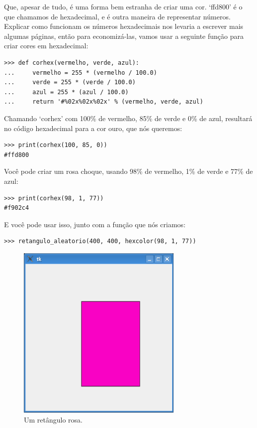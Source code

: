 Que, apesar de tudo, é uma forma bem estranha de criar uma cor. `ffd800' é o que chamamos de hexadecimal, e é outra maneira de representar números. Explicar como funcionam os números hexadecimais nos levaria a escrever mais algumas páginas, então para economizá-las, vamos usar a seguinte função para criar cores em hexadecimal:

\begin{listing}
\begin{verbatim}
>>> def corhex(vermelho, verde, azul):
...     vermelho = 255 * (vermelho / 100.0)
...     verde = 255 * (verde / 100.0)
...     azul = 255 * (azul / 100.0)
...     return '#%02x%02x%02x' % (vermelho, verde, azul)
\end{verbatim}
\end{listing}

Chamando `corhex' com 100\% de vermelho, 85\% de verde e 0\% de azul, resultará no código hexadecimal para a cor ouro, que nós queremos:

\begin{listing}
\begin{verbatim}
>>> print(corhex(100, 85, 0))
#ffd800
\end{verbatim}
\end{listing}

\noindent
Você pode criar um rosa choque, usando 98\% de vermelho, 1\% de verde e 77\% de azul:

\begin{listing}
\begin{verbatim}
>>> print(corhex(98, 1, 77))
#f902c4
\end{verbatim}
\end{listing}

\noindent
E você pode usar isso, junto com a função  que nós criamos:

\begin{listing}
\begin{verbatim}
>>> retangulo_aleatorio(400, 400, hexcolor(98, 1, 77))
\end{verbatim}
\end{listing}

\begin{figure}
\begin{center}
\includegraphics[width=80mm]{eps/figure35.eps}
\end{center}
\caption{Um retângulo rosa.}\label{fig35}
\end{figure}

